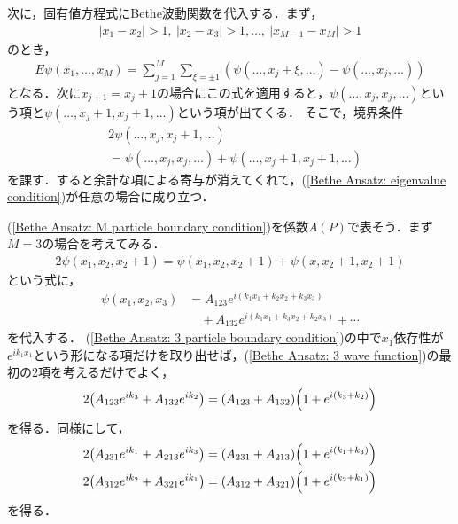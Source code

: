 \documentclass[\main/main.tex]{subfiles}
\begin{document}
\begin{frame}
    次に，固有値方程式にBethe波動関数を代入する．まず，
    \begin{align}
        |x_1-x_2|>1,~ |x_2-x_3|>1,\ldots,~ |x_{M-1}-x_M|>1
    \end{align}
    のとき，
    \begin{align}
        E\psi(x_1,\ldots,x_M) = 
        \sum_{j=1}^M \sum_{\xi=\pm 1} (\psi(\ldots,x_j+\xi,\ldots)-\psi(\ldots,x_j,\ldots))
        \label{Bethe Ansatz: eigenvalue condition}
    \end{align}
    となる．次に$x_{j+1}=x_j+1$の場合にこの式を適用すると，$\psi(\ldots,x_j,x_j,\ldots)$という項と$\psi(\ldots,x_j+1,x_j+1,\ldots)$という項が出てくる．
    そこで，境界条件
    \begin{align}
        & \nonumber
        2\psi(\ldots,x_j,x_j+1,\ldots)
        \\ &
        = \psi(\ldots,x_j,x_j,\ldots)+ \psi(\ldots,x_j+1,x_j+1,\ldots)
        \label{Bethe Ansatz: M particle boundary condition}
    \end{align}
    を課す．すると余計な項による寄与が消えてくれて，(\ref{Bethe Ansatz: eigenvalue condition})が任意の場合に成り立つ．
\end{frame}

\begin{frame}
    (\ref{Bethe Ansatz: M particle boundary condition})を係数$A(P)$で表そう．まず$M=3$の場合を考えてみる．
    \begin{align}
        2\psi(x_1,x_2,x_2+1) = \psi(x_1,x_2,x_2+1) + \psi(x,x_2+1,x_2+1)
        \label{Bethe Ansatz: 3 particle boundary condition}
    \end{align}
    という式に，
    \begin{align}
        \psi(x_1,x_2,x_3) &\nonumber
        = A_{123}e^{i(k_1x_1+k_2x_2+k_3x_3)}
        \\ & \quad
        + A_{132}e^{i(k_1x_1 + k_3x_2 + k_2x_3)} + \cdots
        \label{Bethe Ansatz: 3 wave function}
    \end{align}
    を代入する．
    (\ref{Bethe Ansatz: 3 particle boundary condition})の中で$x_1$依存性が$e^{ik_1 x_1}$という形になる項だけを取り出せば，(\ref{Bethe Ansatz: 3 wave function})の最初の2項を考えるだけでよく，
    \begin{align}
        2\qty(A_{123}e^{ik_3} + A_{132}e^{ik_2}) = (A_{123} + A_{132})\qty(1 + e^{i(k_3+k_2)})
    \end{align}
    を得る．同様にして，
    \begin{align}
        2\qty(A_{231}e^{ik_1}+A_{213}e^{ik_3}) = (A_{231}+A_{213})\qty(1+e^{i(k_1+k_3)})
        \\
        2\qty(A_{312}e^{ik_2}+A_{321}e^{ik_1}) = (A_{312}+A_{321})\qty(1+e^{i(k_2+k_1)})
    \end{align}
    を得る．
\end{frame}
\end{document}
